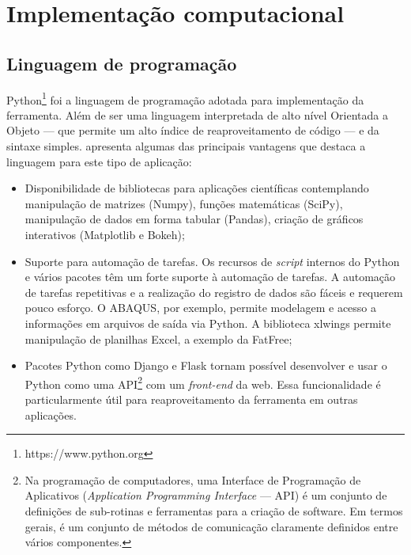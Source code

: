 \section{Implementação computacional}


\subsection{Linguagem de programação}\label{sec:python}

Python\footnote{https://www.python.org} foi a linguagem de programação adotada para implementação da ferramenta. Além de ser uma linguagem interpretada de alto nível Orientada a Objeto --- que permite um alto índice de reaproveitamento de código --- e da sintaxe simples.  apresenta algumas das principais vantagens que destaca a linguagem para este tipo de aplicação:

\begin{itemize}
    \item Disponibilidade de bibliotecas para aplicações científicas contemplando manipulação de matrizes (Numpy), funções matemáticas (SciPy), manipulação de dados em forma tabular (Pandas), criação de gráficos interativos (Matplotlib e Bokeh);

    \item Suporte para automação de tarefas. Os recursos de \textit{script} internos do Python e vários pacotes têm um forte suporte à automação de tarefas. A automação de tarefas repetitivas e a realização do registro de dados são fáceis e requerem pouco esforço. O ABAQUS, por exemplo, permite modelagem e acesso a informações em arquivos de saída via Python. A biblioteca xlwings permite manipulação de planilhas Excel, a exemplo da FatFree;

    \item Pacotes Python como Django e Flask tornam possível desenvolver e usar o Python como uma API\footnote{Na programação de computadores, uma Interface de Programação de Aplicativos (\textit{Application Programming Interface} --- API) é um conjunto de definições de sub-rotinas e ferramentas para a criação de software. Em termos gerais, é um conjunto de métodos de comunicação claramente definidos entre vários componentes.} com um \textit{front-end} da web. Essa funcionalidade é particularmente útil para reaproveitamento da ferramenta  em outras aplicações.
\end{itemize}


